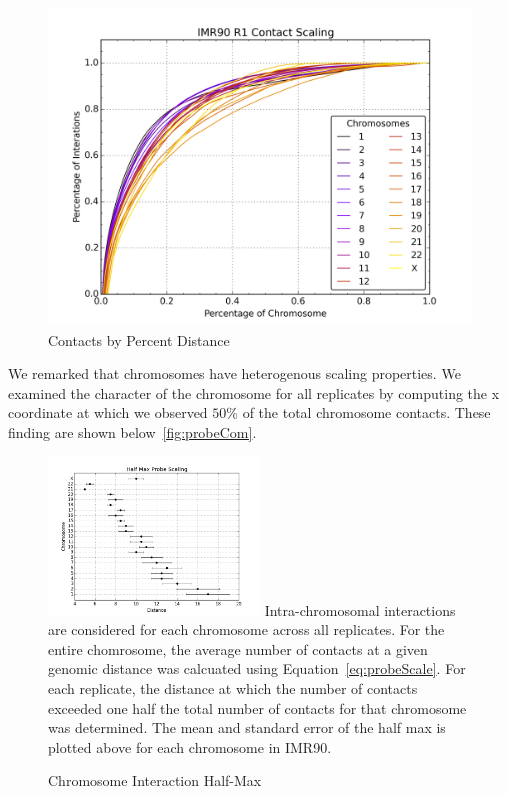 \begin{figure}[thp]
  \begin{minipage}{0.45\textwidth}
    \centering
    \caption{Contacts by Percent Distance}\label{fig:probeScalesPercent}
    \includegraphics[width=\textwidth]{./figures/results/probeScalesPercent.png}
  \end{minipage}
\end{figure}

We remarked that chromosomes have heterogenous scaling properties.  We examined the character of the chromosome for all replicates
by computing the x coordinate at which we observed $50\%$ of the total chromosome contacts.  These finding are shown below~\ref{fig:probeCom}.

\begin{figure}[thp]
  \centering
  \caption{Chromosome Interaction Half-Max}
  \includegraphics[width=0.5\textwidth]{./figures/results/com.png}
  \medskip
  \small
  Intra-chromosomal interactions are considered for each chromosome across all replicates.  For the entire chomrosome, the average number of
  contacts at a given genomic distance was calcuated using Equation~\ref{eq:probeScale}.  For each replicate, the distance at which the number
  of contacts exceeded one half the total number of contacts for that chromosome was determined.  The mean and standard error of the half max
  is plotted above for each chromosome in IMR90.
\end{figure}

